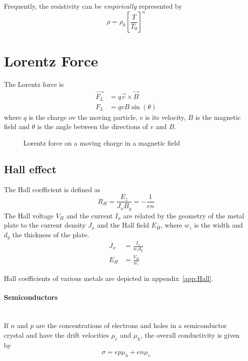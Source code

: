 Frequently, the resistivity can be \emph{empirically} represented by
\begin{equation}
    \rho = \rho_0 \left[ \frac{T}{T_0} \right]^n
\end{equation}

\section{Lorentz Force}

The Lorentz force is
\begin{align}
    \vec{F_L} &= q \vec{v} \times \vec{B} \\
    F_L &= q v B \sin(\theta)
\end{align}
where $q$ is the charge ov the moving particle, $v$ is its velocity,
$B$ is the magnetic field and $\theta$ is the angle between the directions
of $v$ and $B$.

\begin{figure}[ht!]
    \centering
    
    \caption{Lorentz force on a moving charge in a magnetic field}
\end{figure}

\subsection{Hall effect}

The Hall coefficient  is defined as
\begin{equation}
    R_H = \frac{E_z}{J_x B_y} = -\frac{1}{en}
\end{equation}
The Hall voltage $V_H$ and the current $I_x$ are related by the geometry of the metal plate to the current density $J_x$ and the Hall field $E_H$, where $w_z$ is the width and $d_y$ the thickness of the plate.
\begin{align}
    J_x &= \frac{I_x}{w_z d_y} \\
    E_H &= \frac{V_H}{w_z}
\end{align}

Hall coefficients of various metals are depicted in appendix~\ref{app:Hall}.

\paragraph{Semiconductors}~\\
If $n$ and $p$ are the concentrations of electrons and holes in a
semiconductor crystal and have the drift velocities $\mu_e$ and $\mu_h$,
the overall conductivity is given by
\begin{equation}
    \sigma = e p \mu_h + e n \mu_e
\end{equation}

